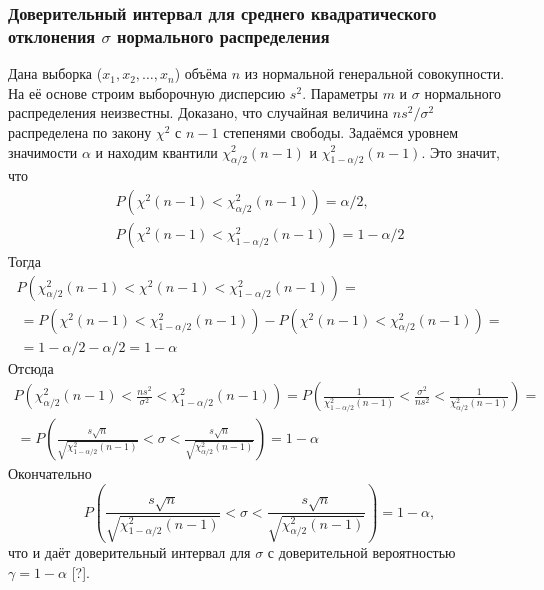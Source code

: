 \documentclass[main.tex]{subfiles}
\begin{document}
\subsubsection{Доверительный интервал для среднего квадратического отклонения $\sigma$ нормального распределения}
Дана выборка ($x_{1},x_{2}, \dots ,x_{n}$) объёма $n$ из нормальной генеральной совокупности. На её основе строим выборочную дисперсию $s^{2}$. Параметры $m$ и $\sigma$ нормального распределения неизвестны. Доказано, что случайная величина $ns^{2}/\sigma^{2}$ распределена по закону $\chi^{2}$ с $n-1$ степенями свободы.
\newline
Задаёмся уровнем значимости $\alpha$ и находим квантили $\chi^{2}_{\alpha/2}(n-1)$ и $\chi^{2}_{1-\alpha/2}(n-1)$.
\newline
Это значит, что 
\begin{equation}
	\begin{split}
		P\left(\chi^{2}(n-1) < \chi^{2}_{\alpha/2}(n-1)\right) = \alpha/2, \\
		P\left(\chi^{2}(n-1) < \chi^{2}_{1-\alpha/2}(n-1)\right) = 1-\alpha/2
	\end{split}
	\label{eq:P_chi_2x2}        
\end{equation}
Тогда
\begin{multline}
	P\left(\chi^{2}_{\alpha/2}(n-1) < \chi^{2}(n-1) < \chi^{2}_{1-\alpha/2}(n-1)\right) = \\\ =
	P\left(\chi^{2}(n-1) < \chi^{2}_{1-\alpha/2}(n-1)\right) -P\left(\chi^{2}(n-1) < \chi^{2}_{\alpha/2}(n-1)\right) = \\\ = 1 - \alpha/2 -\alpha/2 = 1 - \alpha
	\label{eq:P_chi_2}
\end{multline}
Отсюда
\begin{multline}
	P\left(\chi^{2}_{\alpha/2}(n-1) < \frac{ns^{2}}{\sigma^{2}} < \chi^{2}_{1-\alpha/2}(n-1)\right) =
	P\left(\frac{1}{\chi^{2}_{1-\alpha/2}(n-1)} < \frac{\sigma^{2}}{ns^{2}} < \frac{1}{\chi^{2}_{\alpha/2}(n-1)} \right) = \\\ =
	P\left(\frac{s\sqrt{n}}{\sqrt{\chi^{2}_{1-\alpha/2}(n-1)}} < \sigma <  \frac{s\sqrt{n}}{\sqrt{\chi^{2}_{\alpha/2}(n-1)}}\right) = 1- \alpha
	\label{eq:interv}
\end{multline}
Окончательно
\begin{equation}
	P\left(\frac{s\sqrt{n}}{\sqrt{\chi^{2}_{1-\alpha/2}(n-1)}} < \sigma <  \frac{s\sqrt{n}}{\sqrt{\chi^{2}_{\alpha/2}(n-1)}}\right) = 1- \alpha,
	\label{eq:fin_interval}
\end{equation}
что и даёт доверительный интервал для $\sigma$ с доверительной вероятностью $\gamma = 1 - \alpha$ [?].
\end{document}
